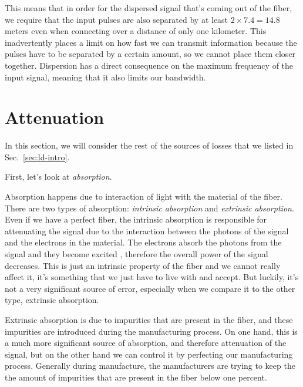 This means that in order for the dispersed signal that's coming out of the fiber, we require that the input pulses are also separated by at least $2\times 7.4 = 14.8$ meters even when connecting over a distance of only one kilometer. This inadvertently places a limit on how fast we can transmit information because the pulses have to be separated by a certain amount, so we cannot place them closer together. Dispersion has a direct consequence on the maximum frequency of the input signal, meaning that it also limits our bandwidth.



\section{Attenuation}
\label{sec:11-3_attenuation}

In this section, we will consider the rest of the sources of losses that we listed in Sec.~\ref{sec:ld-intro}.

First, let's look at \emph{absorption}.

Absorption happens due to interaction of light with the material of the fiber. There are two types of absorption: \emph{intrinsic absorption} and \emph{extrinsic absorption}. Even if we have a perfect fiber, the intrinsic absorption is responsible for attenuating the signal due to the interaction between the photons of the signal and the electrons in the material. The electrons absorb the photons from the signal and they become excited , therefore the overall  power of the signal decreases. This is just an intrinsic property of the fiber and we cannot really affect it, it's something that we just have to live with and accept. But luckily, it's not a very significant source of error, especially when we compare it to the other type, extrinsic absorption.

Extrinsic absorption is due to impurities that are present in the fiber, and these impurities are introduced during the manufacturing process. On one hand, this is a much more significant source of absorption, and therefore attenuation of the signal, but on the other hand we can control it by perfecting our manufacturing process. Generally during manufacture, the manufacturers are trying to keep the the amount of impurities that are present in the fiber below one percent. 

